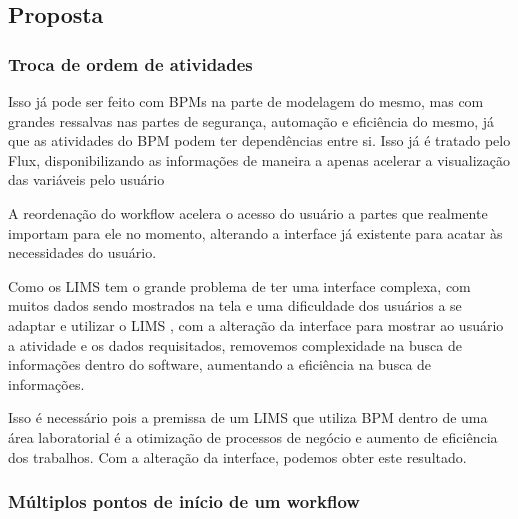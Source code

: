 \subsection{Proposta}

\subsubsection{Troca de ordem de atividades}




Isso já pode ser feito com BPMs na parte de modelagem do mesmo, mas com grandes ressalvas nas partes de segurança, automação e eficiência do mesmo, já que as atividades do BPM podem ter dependências entre si. Isso já é tratado pelo Flux, disponibilizando as informações de maneira a apenas acelerar a visualização das variáveis pelo usuário


A reordenação do workflow acelera o acesso do usuário a partes que realmente importam para ele no momento, alterando a interface já existente para acatar às necessidades do usuário.


Como os LIMS tem o grande problema de ter uma interface complexa, com muitos dados sendo mostrados na tela e uma dificuldade dos usuários a se adaptar e utilizar o LIMS \R, com a alteração da interface para mostrar ao usuário a atividade e os dados requisitados, removemos complexidade na busca de informações dentro do software, aumentando a eficiência na busca de informações.


Isso é necessário pois a premissa de um LIMS que utiliza BPM dentro de uma área laboratorial é a otimização de processos de negócio e aumento de eficiência dos trabalhos. Com a alteração da interface, podemos obter este resultado.


\subsubsection{Múltiplos pontos de início de um workflow}


